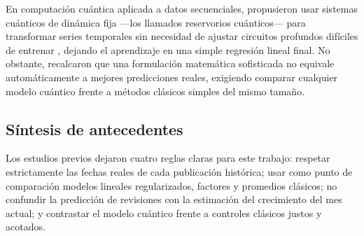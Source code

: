 En computación cuántica aplicada a datos secuenciales, \textcite{fujii2017} propusieron usar sistemas cuánticos de dinámica fija —los llamados reservorios cuánticos— para transformar series temporales sin necesidad de ajustar circuitos profundos difíciles de entrenar \parencite{cerezo2021}, dejando el aprendizaje en una simple regresión lineal final. No obstante, \textcite{schuld2021} recalcaron que una formulación matemática sofisticada no equivale automáticamente a mejores predicciones reales, exigiendo comparar cualquier modelo cuántico frente a métodos clásicos simples del mismo tamaño.

\subsection{Síntesis de antecedentes}

Los estudios previos dejaron cuatro reglas claras para este trabajo: respetar estrictamente las fechas reales de cada publicación histórica; usar como punto de comparación modelos lineales regularizados, factores y promedios clásicos; no confundir la predicción de revisiones con la estimación del crecimiento del mes actual; y contrastar el modelo cuántico frente a controles clásicos justos y acotados.
